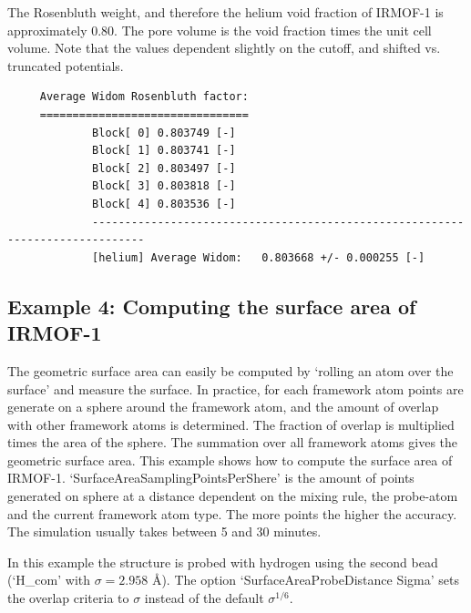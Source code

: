 The Rosenbluth weight, and therefore the helium void fraction of IRMOF-1 is approximately 0.80.
The pore volume is the void fraction times the unit cell volume. Note that the values dependent
slightly on the cutoff, and shifted vs. truncated potentials.
\begin{tiny}
\begin{verbatim}
     Average Widom Rosenbluth factor:
     ================================
             Block[ 0] 0.803749 [-]
             Block[ 1] 0.803741 [-]
             Block[ 2] 0.803497 [-]
             Block[ 3] 0.803818 [-]
             Block[ 4] 0.803536 [-]
             ------------------------------------------------------------------------------
             [helium] Average Widom:   0.803668 +/- 0.000255 [-]
\end{verbatim}
\end{tiny}

\subsection*{Example 4: Computing the surface area of IRMOF-1}

The geometric surface area can easily be computed by `rolling an atom over the surface' and measure the surface. In practice,
for each framework atom points are generate on a sphere around the framework atom, and the amount of overlap with other framework
atoms is determined. The fraction of overlap is multiplied times the area of the sphere. The summation over all framework atoms
gives the geometric surface area. This example shows how to compute the surface area of IRMOF-1. `SurfaceAreaSamplingPointsPerShere'
is the amount of points generated on sphere at a distance dependent on the mixing rule, the probe-atom and the current framework atom type.
The more points the higher the accuracy. The simulation usually takes between 5 and 30 minutes.

In this example the structure is probed with hydrogen using the second bead (`H\_com' with $\sigma=2.958$ \AA). The option
`SurfaceAreaProbeDistance Sigma' sets the overlap criteria to $\sigma$ instead of the default $\sigma^{1/6}$.

